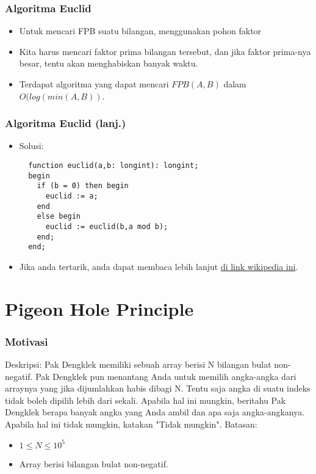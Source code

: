 \begin{frame}
\frametitle{Algoritma Euclid}
\begin{itemize}
  \item Untuk mencari FPB suatu bilangan, menggunakan pohon faktor 
  \item Kita harus mencari faktor prima bilangan tersebut, dan jika faktor prima-nya besar, tentu akan menghabiskan banyak waktu.
  \item Terdapat algoritma yang dapat mencari $FPB(A,B)$ dalam $O(log(min(A,B))$.
\end{itemize}
\end{frame}

\begin{frame}[fragile]
\frametitle{Algoritma Euclid (lanj.)}
\begin{itemize}
  \item Solusi:
  \begin{lstlisting}
  function euclid(a,b: longint): longint;
  begin
    if (b = 0) then begin
      euclid := a;
    end
    else begin
      euclid := euclid(b,a mod b);
    end;
  end;
  \end{lstlisting}
  \item Jika anda tertarik, anda dapat membaca lebih lanjut \textcolor{blue}{\href{https://en.wikipedia.org/wiki/Euclidean_algorithm}{di link wikipedia ini}.}   
\end{itemize}
\end{frame}

\section{Pigeon Hole Principle}
\frame{\sectionpage}

\begin{frame}
\frametitle{Motivasi}
Deskripsi: \newline
Pak Dengklek memiliki sebuah array berisi N bilangan bulat non-negatif. Pak Dengklek pun menantang Anda untuk memilih angka-angka dari arraynya yang jika dijumlahkan habis dibagi N. Tentu saja angka di suatu indeks tidak boleh dipilih lebih dari sekali. Apabila hal ini mungkin, beritahu Pak Dengklek berapa banyak angka yang Anda ambil dan apa saja angka-angkanya. Apabila hal ini tidak mungkin, katakan "Tidak mungkin". \newline\newline
Batasan:
\begin{itemize}
  \item $1 \leq N \leq 10^{5}$
  \item Array berisi bilangan bulat non-negatif.
\end{itemize}
\end{frame}

